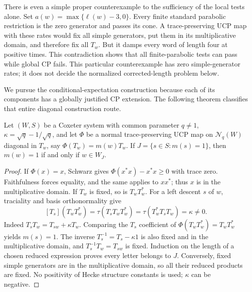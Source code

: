 There is even a simple proper counterexample to the sufficiency of the
local tests alone. Set $a(w)=\max\{\ell(w)-3,0\}$. Every finite standard
parabolic restriction is the zero generator and passes its cone. A
trace-preserving UCP map with these rates would fix all simple generators,
put them in its multiplicative domain, and therefore fix all $T_w$.
But it damps every word of length four at positive times. This contradiction
shows that all finite-parabolic tests can pass while global CP fails.
This particular counterexample has zero simple-generator rates; it does
not decide the normalized corrected-length problem below.

We pursue the conditional-expectation construction because each of its
components has a globally justified CP extension. The following theorem
classifies that entire diagonal construction route.

\begin{lemma}\label{lem:p2-descent}
Let $(W,S)$ be a Coxeter system with common parameter $q\ne1$,
$\kappa=\sqrt q-1/\sqrt q$, and let $\Phi$ be a normal trace-preserving
UCP map on $\mathcal N_q(W)$ diagonal in $T_w$, say
$\Phi(T_w)=m(w)T_w$. If $J=\{s\in S:m(s)=1\}$, then
$m(w)=1$ if and only if $w\in W_J$.
\end{lemma}
\begin{proof}
If $\Phi(x)=x$, Schwarz gives $\Phi(x^*x)-x^*x\geq0$ with trace zero.
Faithfulness forces equality, and the same applies to $xx^*$; thus $x$
is in the multiplicative domain. If $T_w$ is fixed, so is $T_wT_w^*$.
For a left descent $s$ of $w$, traciality and basis orthonormality give
\begin{equation}\label{eq:p2-descent}
 [T_s](T_wT_w^*)=\tau(T_sT_wT_w^*)
 =\tau(T_w^*T_sT_w)=\kappa\ne0.
\end{equation}
Indeed $T_sT_w=T_{sw}+\kappa T_w$. Comparing the $T_s$ coefficient of
$\Phi(T_wT_w^*)=T_wT_w^*$ yields $m(s)=1$.
The inverse $T_s^{-1}=T_s-\kappa1$ is also fixed and in the
multiplicative domain, and $T_s^{-1}T_w=T_{sw}$ is fixed. Induction on
the length of a chosen reduced expression proves every letter belongs
to $J$. Conversely, fixed simple generators are in the multiplicative
domain, so all their reduced products are fixed.
No positivity of Hecke structure constants is used; $\kappa$ can be negative.
\end{proof}

